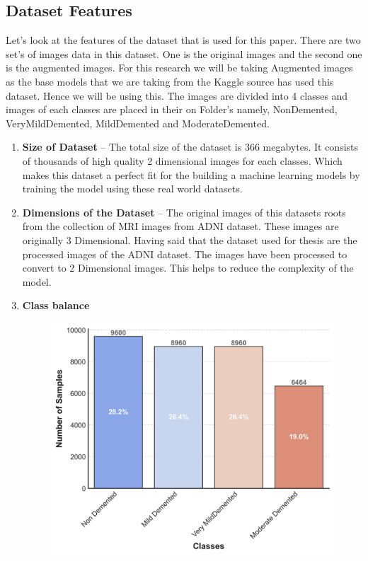 \documentclass[12pt,onecolumn]{report}
\begin{document}
\subsection{Dataset Features}
Let's look at the features of the dataset that is used for this paper. There are two set's of images data in this dataset. One is the original images and the second one is the augmented images. For this research we will be taking Augmented images as the base models that we are taking from the Kaggle source has used this dataset. Hence we will be using this. The images are divided into 4 classes and images of each classes are placed in their on Folder's namely, NonDemented, VeryMildDemented, MildDemented and ModerateDemented.
\begin{enumerate}
    \item \textbf{Size of Dataset} 
    – The total size of the dataset is 366 megabytes. It consists of thousands of high quality 2 dimensional images for each classes. Which makes this dataset a perfect fit for the building a machine learning models by training the model using these real world datasets.
    \item \textbf{Dimensions of the Dataset} – The original images of this datasets roots from the collection of MRI images from ADNI dataset. These images are originally 3 Dimensional. Having said that the dataset used for thesis are the processed images of the ADNI dataset. The images have been processed to convert to 2 Dimensional images. This helps to reduce the complexity of the model.
    \item \textbf{Class balance} 
    \begin{figure}[h!]
        \centering
        \includegraphics[width=0.8\columnwidth]{figures/dataset_class_distribution.png}  %

\end{figure}
\end{enumerate}
\end{document}
